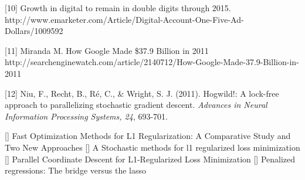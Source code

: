 \documentclass{article} %
\begin{document}
{[10] Growth in digital to remain in double digits through 2015. http://www.emarketer.com/Article/Digital-Account-One-Five-Ad-Dollars/1009592

[11] Miranda M. How Google Made \$37.9 Billion in 2011 http://searchenginewatch.com/article/2140712/How-Google-Made-37.9-Billion-in-2011

[12] Niu, F., Recht, B., Ré, C., \& Wright, S. J. (2011). Hogwild!: A lock-free approach to parallelizing stochastic gradient descent. {\it Advances in Neural Information Processing Systems, 24}, 693-701.


[] Fast Optimization Methods for L1 Regularization: A Comparative Study and Two New Approaches
[] A Stochastic methods for l1 regularized loss minimization
[] Parallel Coordinate Descent for L1-Regularized Loss Minimization
[] Penalized regressions: The bridge versus the lasso
}
\end{document}
